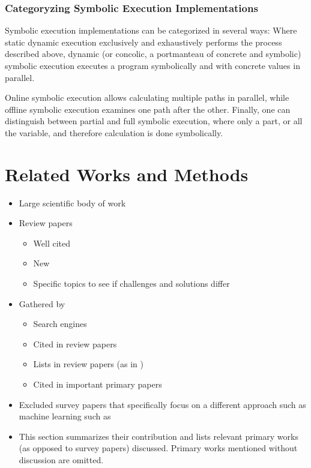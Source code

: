 \documentclass{article}
\begin{document}
\begin{multicols}{2}
    \subsubsection{Categoryzing Symbolic Execution Implementations}
    Symbolic execution implementations can be categorized in several ways: Where static dynamic execution exclusively and exhaustively performs the process described above, dynamic (or concolic, a portmanteau of concrete and symbolic) symbolic execution executes a program symbolically and with concrete values in parallel.

    Online symbolic execution allows calculating multiple paths in parallel, while offline symbolic execution examines one path after the other. Finally, one can distinguish between partial and full symbolic execution, where only a part, or all the variable, and therefore calculation is done symbolically.\cite{Ghidrion}

    \section{Related Works and Methods}
    \label{Methods}
    \begin{itemize}
        \item Large scientific body of work
        \item Review papers
              \begin{itemize}
                  \item Well cited
                  \item New
                  \item Specific topics to see if challenges and solutions differ
              \end{itemize}
        \item Gathered by
              \begin{itemize}
                  \item Search engines
                  \item Cited in review papers
                  \item Lists in review papers (as in \cite{Demystifying})
                  \item Cited in important primary papers
              \end{itemize}
        \item Excluded survey papers that specifically focus on a different approach such as machine learning such as \cite{ML1, ML2}
        \item This section summarizes their contribution and lists relevant primary works (as opposed to survey papers) discussed. Primary works mentioned without discussion are omitted.
    \end{itemize}


\end{multicols}
\end{document}
